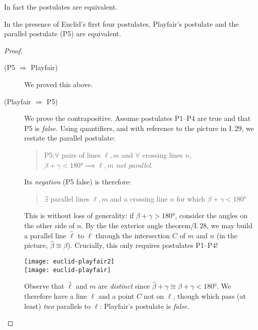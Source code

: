 In fact the postulates are equivalent.

\begin{thm}{}{}
	In the presence of Euclid's first four postulates, Playfair's postulate and the parallel postulate (P5) are equivalent.
\end{thm}

\begin{proof}
	\begin{description}
		\item[\normalfont (P5 $\Rightarrow$ Playfair)] We proved this above.
		\item[\normalfont (Playfair $\Rightarrow$ P5)] We prove the contrapositive. Assume postulates P1--P4 are true and that P5 is \emph{false.} Using quantifiers, and with reference to the picture in I.\,29, we restate the parallel postulate:
	\begin{quote}
	  P5:\lstsp $\forall$ pairs of lines $\ell,m$ and $\forall$ crossing lines $n$, \  $\beta+\gamma<\ang{180}\implies\ell,m$ \emph{not parallel.}
	\end{quote}
	\begin{minipage}[t]{0.62\linewidth}\vspace{-7pt}
		Its \emph{negation} (P5 false) is therefore:
		\begin{quote}
	  	$\exists$ parallel lines $\ell,m$ and a crossing line $n$ for which $\beta+\gamma<\ang{180}$
		\end{quote}
		This is without loss of generality: if $\beta+\gamma>\ang{180}$, consider the angles on the other side of $n$.\medbreak
		By the the exterior angle theorem/I.\,28, we may build a parallel line $\hat\ell$ to $\ell$ through the intersection $C$ of $m$ and $n$ (in the picture, $\hat\beta\cong\beta$). Crucially, this only requires postulates P1--P4!
	\end{minipage}
	\hfill
	\begin{minipage}[t]{0.37\linewidth}\vspace{0pt}
		\flushright
		\texttt{[image: euclid-playfair2]}\\
		\texttt{[image: euclid-playfair]}
	\end{minipage}\smallbreak
	Observe that $\hat\ell$ and $m$ are \emph{distinct} since $\hat\beta+\gamma\cong\beta+\gamma<\ang{180}$.
	We therefore have a line $\ell$ and a point $C$ not on $\ell$, though which pass (at least) \emph{two} parallels to $\ell$: Playfair's postulate is \emph{false.} \qedhere
	\end{description}
\end{proof}



